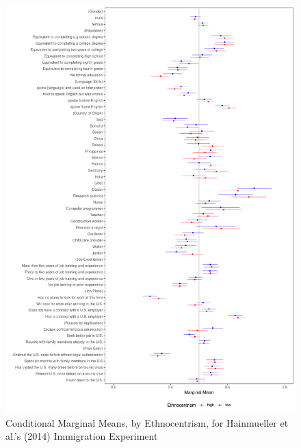 \documentclass[a4paper,12pt]{article}\usepackage[]{graphicx}\usepackage[]{color}
\makeatletter
\def\maxwidth{ %
  \ifdim\Gin@nat@width>\linewidth
    \linewidth
  \else
    \Gin@nat@width
  \fi
}
\newenvironment{knitrout}{}{} %
\makeatother
\begin{document}
\begin{knitrout}
\color{fgcolor}\begin{figure}
\includegraphics[width=\maxwidth]{figure/hainmueller_mm_by_ethnocentrism-1} \caption[Conditional Marginal Means, by Ethnocentrism, for Hainmueller et al.'s (2014) Immigration Experiment]{Conditional Marginal Means, by Ethnocentrism, for Hainmueller et al.'s (2014) Immigration Experiment}\label{fig:hainmueller_mm_by_ethnocentrism}
\end{figure}


\end{knitrout}
\end{document}
